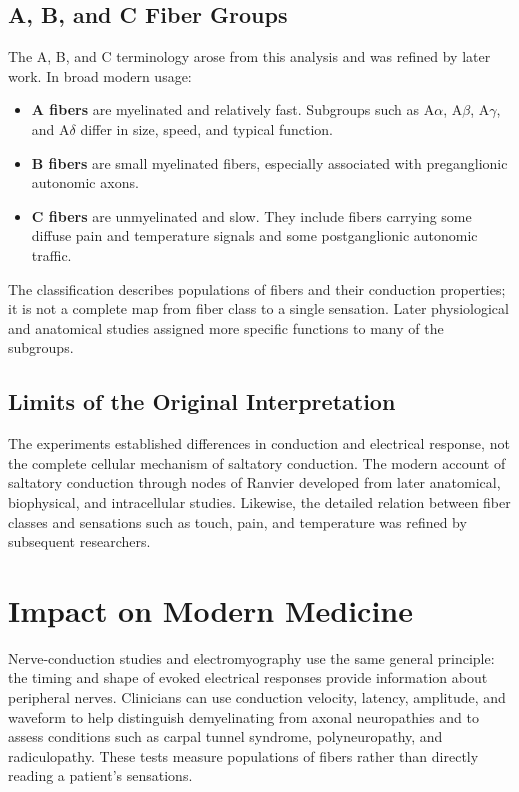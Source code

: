 \subsection{A, B, and C Fiber Groups}

The A, B, and C terminology arose from this analysis and was refined by later work. In broad modern usage:

\begin{itemize}
\item \textbf{A fibers} are myelinated and relatively fast. Subgroups such as A$\alpha$, A$\beta$, A$\gamma$, and A$\delta$ differ in size, speed, and typical function.
\item \textbf{B fibers} are small myelinated fibers, especially associated with preganglionic autonomic axons.
\item \textbf{C fibers} are unmyelinated and slow. They include fibers carrying some diffuse pain and temperature signals and some postganglionic autonomic traffic.
\end{itemize}

The classification describes populations of fibers and their conduction properties; it is not a complete map from fiber class to a single sensation. Later physiological and anatomical studies assigned more specific functions to many of the subgroups.

\subsection{Limits of the Original Interpretation}

The experiments established differences in conduction and electrical response, not the complete cellular mechanism of saltatory conduction. The modern account of saltatory conduction through nodes of Ranvier developed from later anatomical, biophysical, and intracellular studies. Likewise, the detailed relation between fiber classes and sensations such as touch, pain, and temperature was refined by subsequent researchers.

\section{Impact on Modern Medicine}

Nerve-conduction studies and electromyography use the same general principle: the timing and shape of evoked electrical responses provide information about peripheral nerves. Clinicians can use conduction velocity, latency, amplitude, and waveform to help distinguish demyelinating from axonal neuropathies and to assess conditions such as carpal tunnel syndrome, polyneuropathy, and radiculopathy. These tests measure populations of fibers rather than directly reading a patient's sensations.

